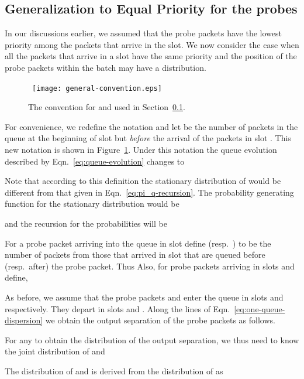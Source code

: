 \documentclass[11pt]{article}
\begin{document}
\subsection{Generalization to Equal Priority for the probes}
\label{sec:equal-priority}
In our discussions earlier, we assumed that the probe packets have the
lowest priority among the packets that arrive in the slot. We now
consider the case when all the packets that arrive in a slot have the
same priority and the position of the probe packets within the batch
may have a distribution.

\begin{figure}
  \begin{center}
    \ \texttt{[image: general-convention.eps]}
  \end{center}
  \caption{The convention for   and  used in
    Section~\ref{sec:equal-priority}. }
  \label{fig:general-convention}
\end{figure}

For convenience, we redefine the notation and let  be the number
of packets in the queue at the beginning of slot  but \emph{before}
the arrival of the packets in slot . This new notation is shown in
Figure~\ref{fig:general-convention}. Under this notation the queue
evolution described by Eqn.~\ref{eq:queue-evolution} changes to


Note that according to this definition the stationary distribution of
 would be different from that given in
Eqn.~\ref{eq:pi_q-recursion}.  The probability generating function for
the stationary distribution would be

and the recursion for the probabilities will be


For a probe packet arriving into the queue in slot  define
 (resp.~) to be the number of packets from
those that arrived in slot  that are queued before (resp.~after)
the probe packet. Thus  Also, for
probe packets arriving in slots  and  define,


As before, we assume that the probe packets  and  enter the
queue in slots  and  respectively. They depart in slots 
and . Along the lines of Eqn.~\ref{eq:one-queue-dispersion} we
obtain the output separation of the probe packets as follows.  



For any  to obtain the distribution of the output
separation, we thus need to know the joint distribution of 
and 

The distribution of  and  is derived from the
distribution of  as
\end{document}
